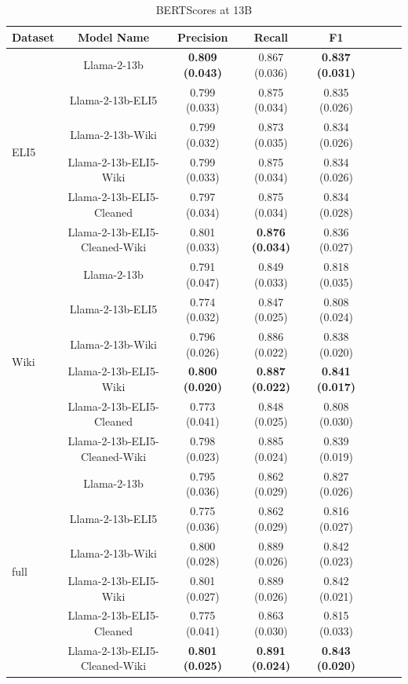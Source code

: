 \documentclass[11pt, oneside]{article}   	%
\begin{document}
\begin{table}[ht]
\centering
\begin{tabular}{lccccccc}
\toprule
Dataset& Model Name  & Precision & Recall & F1 \\
\midrule
\multirow{6}{*}{ELI5} & Llama-2-13b & \textbf{0.809 (0.043)} & 0.867 (0.036) & \textbf{0.837 (0.031)} \\
& Llama-2-13b-ELI5 & 0.799 (0.033) & 0.875 (0.034) & 0.835 (0.026) \\
& Llama-2-13b-Wiki & 0.799 (0.032) & 0.873 (0.035) & 0.834 (0.026) \\
& Llama-2-13b-ELI5-Wiki & 0.799 (0.033) & 0.875 (0.034) & 0.834 (0.026) \\
& Llama-2-13b-ELI5-Cleaned & 0.797 (0.034) & 0.875 (0.034) & 0.834 (0.028) \\
& Llama-2-13b-ELI5-Cleaned-Wiki & 0.801 (0.033) & \textbf{0.876 (0.034)} & 0.836 (0.027) \\
\midrule
\multirow{6}{*}{Wiki} & Llama-2-13b & 0.791 (0.047) & 0.849 (0.033) & 0.818 (0.035) \\
& Llama-2-13b-ELI5 & 0.774 (0.032) & 0.847 (0.025) & 0.808 (0.024) \\
& Llama-2-13b-Wiki & 0.796 (0.026) & 0.886 (0.022) & 0.838 (0.020) \\
& Llama-2-13b-ELI5-Wiki & \textbf{0.800 (0.020)} & \textbf{0.887 (0.022)} & \textbf{0.841 (0.017)} \\
& Llama-2-13b-ELI5-Cleaned & 0.773 (0.041) & 0.848 (0.025) & 0.808 (0.030) \\
& Llama-2-13b-ELI5-Cleaned-Wiki & 0.798 (0.023) & 0.885 (0.024) & 0.839 (0.019) \\
\midrule
\multirow{6}{*}{full} & Llama-2-13b & 0.795 (0.036) & 0.862 (0.029) & 0.827 (0.026) \\
& Llama-2-13b-ELI5 & 0.775 (0.036) & 0.862 (0.029) & 0.816 (0.027) \\
& Llama-2-13b-Wiki & 0.800 (0.028) & 0.889 (0.026) & 0.842 (0.023) \\
& Llama-2-13b-ELI5-Wiki & 0.801 (0.027) & 0.889 (0.026) & 0.842 (0.021) \\
& Llama-2-13b-ELI5-Cleaned & 0.775 (0.041) & 0.863 (0.030) & 0.815 (0.033) \\
& Llama-2-13b-ELI5-Cleaned-Wiki & \textbf{0.801 (0.025)} & \textbf{0.891 (0.024)} & \textbf{0.843 (0.020)} \\
\bottomrule
\end{tabular}
\caption{BERTScores at 13B}
\label{tab:bertscores_13B}
\end{table}
\end{document}
